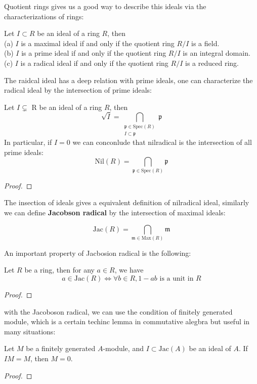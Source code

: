 \documentclass[12pt,a4paper]{article}
\begin{document}
Quotient rings gives us a good way to describe this ideals via the characterizations of rings:
\begin{proposition}
    Let \(I \subset R\) be an ideal of a ring \(R\), then\\
    (a) \(I\) is a maximal ideal if and only if the quotient ring \(R/I\) is a field.\\

    (b) \(I\) is a prime ideal if and only if the quotient ring \(R/I\) is an integral domain.\\

    (c) \(I\) is a radical ideal if and only if the quotient ring \(R/I\) is a reduced ring.\\
\end{proposition}

The raidcal ideal has a deep relation with prime ideals, one can characterize the radical ideal by the intersection of prime ideals:

\begin{lemma}
    Let \(I \subsetneq\) R be an ideal of a ring \(R\), then 
    \[\sqrt{I} = \bigcap_{\substack{\mathfrak{p} \in \mathrm{Spec}(R) \\ I \subset \mathfrak{p}}} \mathfrak{p}\]
    In particular, if \(I = 0\) we can conconlude that nilradical is the intersection of all prime ideals:
    \[\mathrm{Nil}(R) = \bigcap_{\mathfrak{p} \in \mathrm{Spec}(R)} \mathfrak{p}\]
\end{lemma}
\begin{proof}
    
\end{proof}

The insection of ideals gives a equivalent definition of nilradical ideal, similarly we can define \textbf{Jacobson radical} by the intersection of maximal ideals:

\[\mathrm{Jac}(R) = \bigcap_{\mathfrak{m} \in \mathrm{Max}(R)} \mathfrak{m}\]

An important property of Jacbosion radical is the following:
\begin{lemma}
    Let \(R\) be a ring, then for any \(a \in R\), we have
    \[a \in \mathrm{Jac}(R) \iff \forall b \in R, 1 - ab \text{ is a unit in } R\]
\end{lemma}

\begin{proof}
    
\end{proof}

with the Jacoboson radical, we can use the condition of finitely generated module, which is a certain techinc lemma in commutative alegbra but useful in many situations:
\begin{theorem}[Nakayama] \label{Nakayama}
    Let \(M\) be a finitely generated \(A\)-module, and \(I \subset \mathrm{Jac}(A)\) be an ideal of \(A\). If \(IM = M\), then \(M = 0\).
\end{theorem}
\begin{proof}
    
\end{proof}
\end{document}
